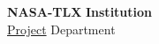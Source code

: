 \documentclass{article}
\begin{document}
\noindent
\large
\textbf{NASA-TLX} \hfill \textbf{Institution} \\
\normalsize
\hyperlink{project_link}{Project} \hfill Department \\



\clearpage


\end{document}

